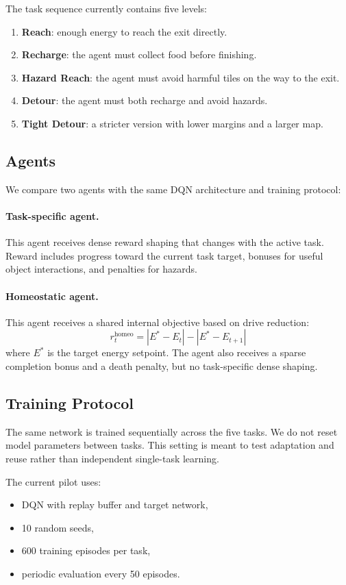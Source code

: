 \documentclass[11pt]{article}
\begin{document}
The task sequence currently contains five levels:
\begin{enumerate}[leftmargin=1.5em]
    \item \textbf{Reach}: enough energy to reach the exit directly.
    \item \textbf{Recharge}: the agent must collect food before finishing.
    \item \textbf{Hazard Reach}: the agent must avoid harmful tiles on the way to the exit.
    \item \textbf{Detour}: the agent must both recharge and avoid hazards.
    \item \textbf{Tight Detour}: a stricter version with lower margins and a larger map.
\end{enumerate}

\subsection{Agents}
We compare two agents with the same DQN architecture and training protocol:

\paragraph{Task-specific agent.}
This agent receives dense reward shaping that changes with the active task. Reward includes progress toward the current task target, bonuses for useful object interactions, and penalties for hazards.

\paragraph{Homeostatic agent.}
This agent receives a shared internal objective based on drive reduction:
\[
r_t^{\text{homeo}} = |E^\ast - E_t| - |E^\ast - E_{t+1}|
\]
where $E^\ast$ is the target energy setpoint. The agent also receives a sparse completion bonus and a death penalty, but no task-specific dense shaping.

\subsection{Training Protocol}
The same network is trained sequentially across the five tasks. We do not reset model parameters between tasks. This setting is meant to test adaptation and reuse rather than independent single-task learning.

The current pilot uses:
\begin{itemize}[leftmargin=1.5em]
    \item DQN with replay buffer and target network,
    \item 10 random seeds,
    \item 600 training episodes per task,
    \item periodic evaluation every 50 episodes.
\end{itemize}
\end{document}
